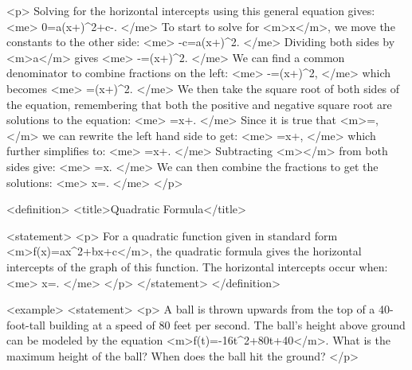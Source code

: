        <p>
            Solving for the horizontal intercepts using this general equation gives:
            <me>
                0=a(x+)^{2}+c-.
            </me>
            To start to solve for <m>x</m>, we move the constants to the other side:
            <me>
                -c=a(x+)^{2}.
            </me>
            Dividing both sides by <m>a</m> gives
            <me>
                -=(x+)^{2}.
            </me>
            We can find a common denominator to combine fractions on the left:
            <me>
                -=(x+)^{2},
            </me>
            which becomes
            <me>
                =(x+)^{2}.
            </me>
            We then take the square root of both sides of the equation, remembering that both the positive and negative square root are solutions to the equation:
            <me>
                \pm {}=x+.
            </me>
            Since it is true that <m>=,</m> we can rewrite the left hand side to get:
            <me>
                \pm {}=x+,
            </me>
            which further simplifies to:
            <me>
                \pm {}=x+.
            </me>
            Subtracting <m></m> from both sides give:
            <me>
                \pm {}=x.
            </me>
            We can then combine the fractions to get the solutions:
            <me>
                x=.
            </me>
        </p>

        <definition>
            <title>Quadratic Formula</title>

            <statement>
                <p>
                    For a quadratic function given in standard form <m>f(x)=ax^{2}+bx+c</m>, the quadratic formula gives the horizontal intercepts of the graph of this function.
                    The horizontal intercepts occur when:
                    <me>
                        x=.
                    </me>
                </p>
            </statement>
        </definition>

        <example>
            <statement>
                <p>
                    A ball is thrown upwards from the top of a 40-foot-tall building at a speed of 80 feet per second.
                    The ball’s height above ground can be modeled by the equation <m>f(t)=-16t^{2}+80t+40</m>.
                    What is the maximum height of the ball? When does the ball hit the ground?
                </p>

